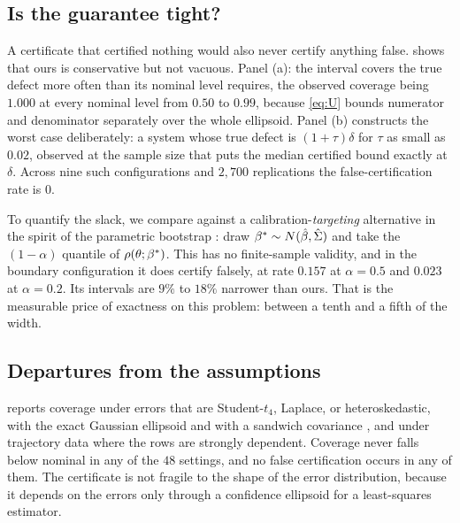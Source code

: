 \subsection{Is the guarantee tight?}
\label{sec:tightness}

A certificate that certified nothing would also never certify anything false.
 shows that ours is conservative but not vacuous. Panel
(a): the interval covers the true defect more often than its nominal level
requires, the observed coverage being $1.000$ at every nominal level from
$0.50$ to $0.99$, because \eqref{eq:U} bounds numerator and denominator
separately over the whole ellipsoid. Panel (b) constructs the worst case
deliberately: a system whose true defect is $(1+\tau)\delta$ for $\tau$ as
small as $0.02$, observed at the sample size that puts the median certified
bound exactly at $\delta$. Across nine such configurations and $2{,}700$
replications the false-certification rate is $0$.

To quantify the slack, we compare against a calibration-\emph{targeting}
alternative in the spirit of the parametric bootstrap
\citep{efron1979bootstrap}: draw $\beta^* \sim N(\hat{\beta}, \hat\Sigma)$ and take
the $(1-\alpha)$ quantile of $\rho(\theta;\beta^*)$. This has no
finite-sample validity, and in the boundary configuration it does certify
falsely, at rate $0.157$ at $\alpha = 0.5$ and $0.023$ at $\alpha = 0.2$. Its
intervals are $9\%$ to $18\%$ narrower than ours. That is the measurable price
of exactness on this problem: between a tenth and a fifth of the width.

\subsection{Departures from the assumptions}
\label{sec:robustness}



 reports coverage under errors that are Student-$t_4$,
Laplace, or heteroskedastic, with the exact Gaussian ellipsoid and with a
sandwich covariance \citep{white1980heteroskedasticity}, and under trajectory
data where the rows are strongly dependent. Coverage never falls below nominal
in any of the $48$ settings, and no false certification occurs in any of them.
The certificate is not fragile to the shape of the error distribution, because
it depends on the errors only through a confidence ellipsoid for a
least-squares estimator.

